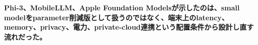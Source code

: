 \noindent\textbf{Phi-3、MobileLLM、Apple Foundation Modelsが示したのは、small modelをparameter削減版として扱うのではなく、端末上のlatency、memory、privacy、電力、private-cloud連携という配置条件から設計し直す流れだった。}\autocite{src-86ea660dfc62,src-c89d38f0e830,src-e78721484043}

